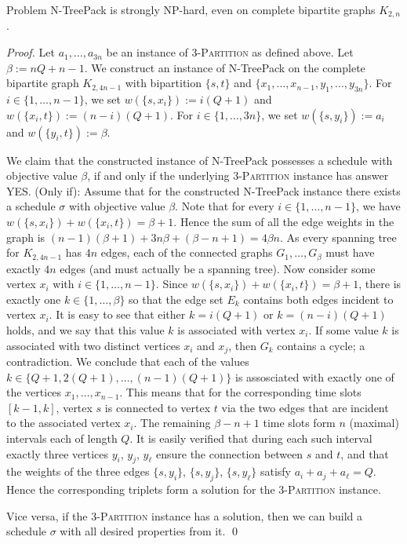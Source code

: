 \documentclass[runningheads]{llncs}
\newcommand{\set}[1]{\{ #1 \}}
\newcommand{\fromto}[2]{\set{#1, \ldots, #2}}
\newcommand{\xxxNTP}{{\sc N-TreePack}}
\begin{document}
\begin{theorem}
\label{thm:hardness_complete_bipartite}
Problem {\xxxNTP} is strongly NP-hard, even on complete bipartite graphs $K_{2,n}$.
\end{theorem}
\begin{proof}
Let $a_1,\ldots,a_{3n}$ be an instance of \textsc{3-Partition} as defined above. 
Let $\beta := nQ + n - 1$. 
We construct an instance of {\xxxNTP} on the complete bipartite graph $K_{2,4n-1}$ with bipartition
$\set{s, t}$ and $\set{x_1, \ldots, x_{n-1}, y_1, \ldots, y_{3n}}$. 
For $i\in\{1, \dots,n-1\}$, we set $w(\set{s,x_i}):= i(Q + 1)$ and $w(\set{x_i,t}):=(n - i)(Q + 1)$. 
For $i\in\{1,\dots,3n\}$, we set $w(\set{s,y_i}):= a_i$ and $w(\set{y_i,t}):= \beta$. 

We claim that the constructed instance of {\xxxNTP} possesses a schedule with objective value $\beta$, 
if and only if the underlying \textsc{3-Partition} instance has answer YES.
(Only if): Assume that for the constructed {\xxxNTP} instance there exists a schedule $\sigma$ with objective value $\beta$. 
Note that for every $i \in \{1,\dots,n-1\}$, we have $w(\set{s,x_i}) + w(\set{x_i,t}) = \beta + 1$. 
Hence the sum of all the edge weights in the graph is $(n-1)(\beta + 1) + 3n\beta + (\beta - n + 1) = 4\beta n$. 
As every spanning tree for $K_{2, 4n-1}$ has $4n$ edges, each of the connected graphs $G_1,\dots,G_\beta$ 
must have exactly $4n$ edges (and must actually be a spanning tree). 
Now consider some vertex $x_i$ with $i\in\{1,\dots,n-1\}$. 
Since $w(\set{s,x_i}) + w(\set{x_i,t})=\beta+1$, there is exactly one $k\in\fromto{1}{\beta}$ so 
that the edge set $E_k$ contains both edges incident to vertex $x_i$. 
It is easy to see that either $k=i(Q+1)$ or $k=(n-i)(Q+1)$ holds, and we say that this value $k$ 
is associated with vertex $x_i$.
If some value $k$ is associated with two distinct vertices $x_i$ and $x_j$, then $G_k$ contains 
a cycle; a contradiction.
We conclude that each of the values $k\in\set{Q+1,2(Q+1),\ldots,(n-1)(Q+1)}$ is assosciated with
exactly one of the vertices $x_1,\ldots,x_{n-1}$.
This means that for the corresponding time slots $[k-1,k]$, vertex $s$ is connected to vertex $t$
via the two edges that are incident to the associated vertex $x_i$.
The remaining $\beta-n+1$ time slots form $n$ (maximal) intervals each of length $Q$.
It is easily verified that during each such interval exactly three vertices $y_i$, $y_j$, $y_{\ell}$
ensure the connection between $s$ and $t$, and that the weights of the three edges $\{s,y_i\}$,
$\{s,y_j\}$, $\{s,y_{\ell}\}$ satisfy $a_i+a_j+a_{\ell}=Q$.
Hence the corresponding triplets form a solution for the \textsc{3-Partition} instance.

Vice versa, if the \textsc{3-Partition} instance has a solution, then we can build a schedule $\sigma$
with all desired properties from it.
\qed
\end{proof}
\end{document}
